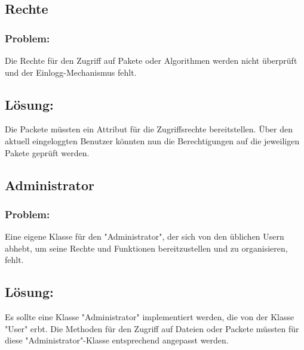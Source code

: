 \documentclass{article}
\newcommand{\RPS}[3]{\subsection{#1} \subsubsection*{Problem:} #2 \subsection*{Lösung:} #3}
\begin{document}
\RPS{Rechte}{%
	Die Rechte für den Zugriff auf Pakete oder Algorithmen werden nicht überprüft und der Einlogg-Mechanismus fehlt.%
}{%
Die Packete müssten ein Attribut für die Zugriffsrechte bereitstellen. Über den aktuell eingeloggten Benutzer könnten nun die Berechtigungen auf die jeweiligen Pakete geprüft werden.%
}

\RPS{Administrator}{%
	Eine eigene Klasse für den "Administrator", der sich von den üblichen Usern abhebt, um seine Rechte und Funktionen bereitzustellen und zu organisieren, fehlt.%
}{%
Es sollte eine Klasse "Administrator" implementiert werden, die von der Klasse "User" erbt. Die Methoden für den Zugriff auf Dateien oder Packete müssten für diese "Administrator"-Klasse entsprechend angepasst werden.%
}
\end{document}
